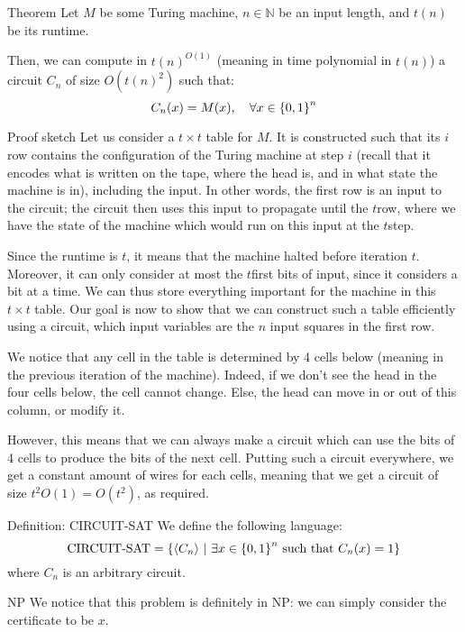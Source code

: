 \documentclass[a4paper]{article}
\begin{document}
\begin{parag}{Theorem}
    Let $M$ be some Turing machine, $n \in \mathbb{N}$ be an input length, and $t\left(n\right)$ be its runtime.

    Then, we can compute in $t\left(n\right)^{O\left(1\right)}$ (meaning in time polynomial in $t\left(n\right)$) a circuit $C_n$ of size $O\left(t\left(n\right)^2\right)$ such that: 
    \[C_n\left(x\right) = M\left(x\right), \mathspace \forall x \in \left\{0, 1\right\}^n\]
    
    \begin{subparag}{Proof sketch}
        Let us consider a $t \times t$ table for $M$. It is constructed such that its $i$\Th row contains the configuration of the Turing machine at step $i$ (recall that it encodes what is written on the tape, where the head is, and in what state the machine is in), including the input. In other words, the first row is an input to the circuit; the circuit then uses this input to propagate until the $t$\Th row, where we have the state of the machine which would run on this input at the $t$\Th step.

        Since the runtime is $t$, it means that the machine halted before iteration $t$. Moreover, it can only consider at most the $t$\Th first bits of input, since it considers a bit at a time. We can thus store everything important for the machine in this $t\times t$ table. Our goal is now to show that we can construct such a table efficiently using a circuit, which input variables are the $n$ input squares in the first row.

        We notice that any cell in the table is determined by 4 cells below (meaning in the previous iteration of the machine). Indeed, if we don't see the head in the four cells below, the cell cannot change. Else, the head can move in or out of this column, or modify it. 

        However, this means that we can always make a circuit which can use the bits of 4 cells to produce the bits of the next cell. Putting such a circuit everywhere, we get a constant amount of wires for each cells, meaning that we get a circuit of size $t^2 O\left(1\right) = O\left(t^2\right)$, as required.
    \end{subparag}
\end{parag}


\begin{parag}{Definition: CIRCUIT-SAT}
    We define the following language:  
    \[\text{CIRCUIT-SAT} = \left\{\left\langle C_n \right\rangle \suchthat \exists x \in \left\{0, 1\right\}^n \text{ such that } C_n\left(x\right) = 1\right\}\]
    where $C_n$ is an arbitrary circuit.

    \begin{subparag}{NP}
        We notice that this problem is definitely in NP: we can simply consider the certificate to be $x$.
    \end{subparag}
    
\end{parag}
\end{document}
